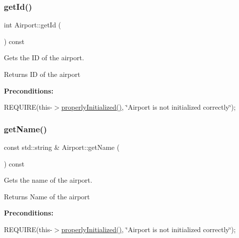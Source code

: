 \subsubsection{\texorpdfstring{get\+Id()}{getId()}}
{\footnotesize\ttfamily int Airport\+::get\+Id (\begin{DoxyParamCaption}{ }\end{DoxyParamCaption}) const}



Gets the ID of the airport. 

\begin{DoxyReturn}{Returns}
ID of the airport
\end{DoxyReturn}
{\bfseries Preconditions\+:}
\begin{DoxyItemize}
\item R\+E\+Q\+U\+I\+RE(this-\/$>$\mbox{\hyperlink{class_airport_aa13e68ac58e8875837fbe888325cfff6}{properly\+Initialized()}}, \char`\"{}\+Airport is not initialized correctly\char`\"{}); 
\end{DoxyItemize}\mbox{\label{class_airport_aa5be38443c1de176e52c4f5f5252c956}} 
\subsubsection{\texorpdfstring{get\+Name()}{getName()}}
{\footnotesize\ttfamily const std\+::string \& Airport\+::get\+Name (\begin{DoxyParamCaption}{ }\end{DoxyParamCaption}) const}



Gets the name of the airport. 

\begin{DoxyReturn}{Returns}
Name of the airport
\end{DoxyReturn}
{\bfseries Preconditions\+:}
\begin{DoxyItemize}
\item R\+E\+Q\+U\+I\+RE(this-\/$>$\mbox{\hyperlink{class_airport_aa13e68ac58e8875837fbe888325cfff6}{properly\+Initialized()}}, \char`\"{}\+Airport is not initialized correctly\char`\"{}); 
\end{DoxyItemize}\mbox{\label{class_airport_a14b74da2358af81c5b5df67aa52b14b6}} 
